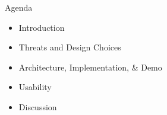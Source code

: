 \begin{frame}{Agenda}
    \begin{itemize}
        \item Introduction
        \item Threats and Design Choices
        \item Architecture, Implementation, \& Demo
        \item Usability
        \item Discussion
    \end{itemize}
\end{frame}
